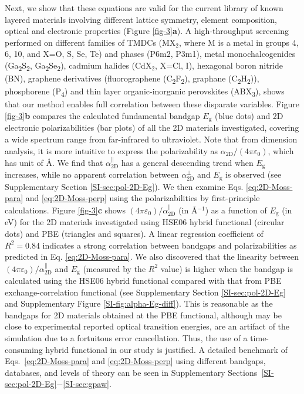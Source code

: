 \documentclass[journal=ancac3,manuscript=article,email=true,hyperref=true,keywords=false]{achemso}
\begin{document}
Next, we show that these equations are valid for the current
library of known layered materials involving different lattice
symmetry, element composition, optical and electronic properties (Figure \ref{fig-3}{\textbf a}).
%
A high-throughput screening performed on different families of TMDCs
(MX\(_{\text{2}}\), where M is a metal in groups 4, 6, 10, and X=O, S,
Se, Te) and phases (P\={6}m2, P3m1), metal monochalcogenides
(Ga\textsubscript{2}S\textsubscript{2},
Ga\textsubscript{2}Se\textsubscript{2}), cadmium halides (CdX$_2$,
X=Cl, I), hexagonal boron nitride (BN), graphene derivatives
(fluorographene (C\textsubscript{2}F\textsubscript{2}), graphane
(C\textsubscript{2}H\textsubscript{2})), phosphorene
(P\textsubscript{4}) and thin layer organic-inorganic perovskites
(ABX\textsubscript{3}), shows that our method enables 
full correlation between these disparate variables.
%
%
Figure \ref{fig-3}{\textbf b} compares the calculated fundamental
bandgap $E_{\mathrm{g}}$ (blue dots) and 2D electronic
polarizabilities (bar plots) of all the 2D materials investigated,
covering a wide spectrum range from far-infrared to ultraviolet.  Note that 
from dimension analysis, it is more intuitive to express the
polarizability as $\alpha_{\mathrm{2D}}/(4 \pi \varepsilon_{0})$,
which has unit of \AA{}. We find that
$\alpha_{\mathrm{2D}}^{\parallel}$ has a general descending trend when
$E_{\mathrm{g}}$ increases, while no apparent correlation between
$\alpha_{\mathrm{2D}}^{\perp}$ and $E_{\mathrm{g}}$ is observed (see
Supplementary Section \ref{SI-sec:pol-2D-Eg}).  We then examine
Eqs. \ref{eq:2D-Moss-para} and \ref{eq:2D-Moss-perp} using the
polarizabilities by first-principle calculations.  Figure
\ref{fig-3}\textbf{c} shows
$(4 \pi \varepsilon_{0})/\alpha_{\mathrm{2D}}^{\parallel}$ (in
\AA{}$^{-1}$) as a function of $E_{\mathrm{g}}$ (in eV) for the 2D 
materials investigated using HSE06 hybrid functional 
(circular dots) and PBE (triangles and squares).  
%
A linear
regression coefficient of $R^{2}=0.84$ indicates a strong correlation
between bandgaps and polarizabilities as predicted in
Eq. \ref{eq:2D-Moss-para}.  We also discovered that the linearity
between $(4 \pi \varepsilon_{0})/\alpha_{\mathrm{2D}}^{\parallel}$ and
$E_{\mathrm{g}}$ (measured by the $R^{2}$ value) is higher when the
bandgap is calculated using the HSE06 hybrid functional compared with
that from PBE exchange-correlation functional (see Supplementary
Section \ref{SI-sec:pol-2D-Eg} and Supplementary Figure
\ref{SI-fig:alpha-Eg-diff}). 
This is reasonable as the bandgaps for 2D materials 
obtained at the PBE functional, 
although may be close to experimental reported 
optical transition energies, are an artifact of the simulation due to a 
fortuitous error cancellation\cite{Heine15,Lee_2017}. Thus, the use of a 
time-consuming hybrid functional in our study is justified. 
A detailed benchmark
of Eqs.~\ref{eq:2D-Moss-para} and \ref{eq:2D-Moss-perp} using
different bandgaps, databases, and levels of theory can be seen
in Supplementary Sections~\ref{SI-sec:pol-2D-Eg}$-$\ref{SI-sec:gpaw}. 
\end{document}
